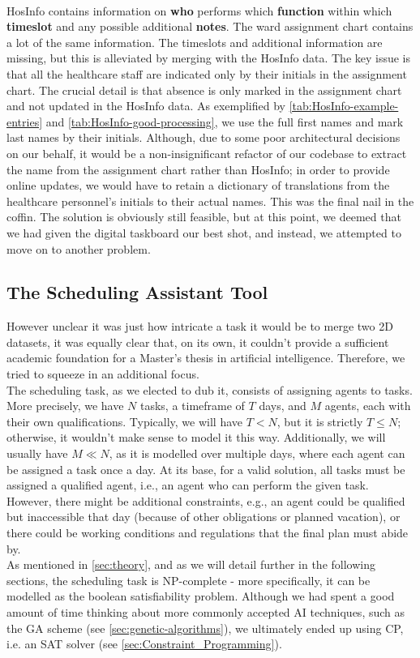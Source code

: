 \\
HosInfo contains information on \textbf{who} performs which \textbf{\gls{function}} within which \textbf{timeslot} and any possible additional \textbf{notes}. The ward assignment chart contains a lot of the same information. The timeslots and additional information are missing, but this is alleviated by merging with the HosInfo data. The key issue is that all the healthcare staff are indicated only by their initials in the assignment chart. The crucial detail is that absence is only marked in the assignment chart and not updated in the HosInfo data. As exemplified by \autoref{tab:HosInfo-example-entries} and \autoref{tab:HosInfo-good-processing}, we use the full first names and mark last names by their initials. Although, due to some poor architectural decisions on our behalf,  it would be a non-insignificant refactor of our codebase to extract the name from the assignment chart rather than HosInfo; in order to provide online updates, we would have to retain a \gls{dictionary} of translations from the healthcare personnel's initials to their actual names. This was the final nail in the coffin. The solution is obviously still feasible, but at this point, we deemed that we had given the digital taskboard our best shot, and instead, we attempted to move on to another problem.

\subsection{The Scheduling Assistant Tool}\label{sec:scheduling-assistant}
However unclear it was just how intricate a task it would be to merge two 2D datasets, it was equally clear that, on its own, it couldn't provide a sufficient academic foundation for a Master's thesis in artificial intelligence. Therefore, we tried to squeeze in an additional focus.
\\
The scheduling task, as we elected to dub it, consists of assigning agents to tasks. More precisely, we have \(N\) tasks, a timeframe of \(T\) days, and \(M\) agents, each with their own qualifications. Typically, we will have \(T < N\), but it is strictly \(T \leq N\); otherwise, it wouldn't make sense to model it this way. Additionally, we will usually have \(M \ll N\), as it is modelled over multiple days, where each agent can be assigned a task once a day. At its base, for a valid solution, all tasks must be assigned a qualified agent, i.e., an agent who can perform the given task. However, there might be additional constraints, e.g., an agent could be qualified but inaccessible that day (because of other obligations or planned vacation), or there could be working conditions and regulations that the final plan must abide by.
\\
As mentioned in \autoref{sec:theory}, and as we will detail further in the following sections, the scheduling task is NP-complete - more specifically, it can be modelled as the boolean satisfiability problem. Although we had spent a good amount of time thinking about more commonly accepted AI techniques, such as the GA scheme (see \autoref{sec:genetic-algorithms}), we ultimately ended up using CP, i.e. an SAT solver (see \autoref{sec:Constraint_Programming}).

